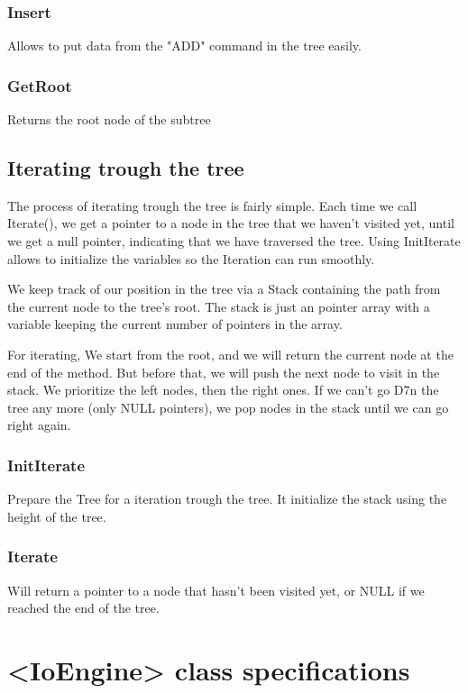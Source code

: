 \documentclass[10pt]{article}
\begin{document}
\subsubsection*{Insert}
Allows to put data from the "ADD" command in the tree easily.

\subsubsection*{GetRoot}
Returns the root node of the subtree

\subsection{Iterating trough the tree}
The process of iterating trough the tree is fairly simple. Each time we call Iterate(), we get a pointer to a node in the tree that we haven’t visited yet, until we get a null pointer, indicating that we have traversed the tree. Using InitIterate allows to initialize the variables so the Iteration can run smoothly.

We keep track of our position in the tree via a Stack containing the path from the current node to the tree's root. The stack is just an pointer array with a variable keeping the current number of pointers in the array.

For iterating, We start from the root, and we will return the current node at the end of the method. But before that, we will push the next node to visit in the stack. We prioritize the left nodes, then the right ones. If we can't go D7n the tree any more (only NULL pointers), we pop nodes in the stack until we can go right again.

\subsubsection*{InitIterate}
Prepare the Tree for a iteration trough the tree. It initialize the stack using the height of the tree.

\subsubsection*{Iterate}
Will return a pointer to a node that hasn't been visited yet, or NULL if we reached the end of the tree.
 
\section{<IoEngine> class specifications}
\end{document}
